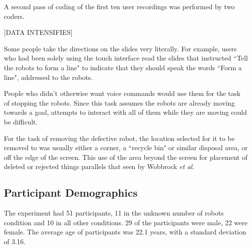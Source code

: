 \documentclass[]{article}
\begin{document}

A second pass of coding of the first ten user recordings was performed by two coders. 

[DATA INTENSIFIES]
 
Some people  take the directions on the slides very literally. 
For example, users who had been solely using the touch interface read the slides that instructed ``Tell the robots to form a line" to indicate that they should speak the words ``Form a line", addressed to the robots.

People  who didn't otherwise want voice commands would use them for the task of stopping the robots. 
Since this task assumes the robots are already moving towards a goal, attempts to interact with all of them while they are moving could be difficult. 

For the task of removing the defective robot, the location selected for it to be removed to was usually either a corner, a ``recycle bin" or similar disposal area, or off the edge of the screen. This use of the area beyond the screen for placement of deleted or rejected things parallels that seen by Wobbrock \textit{et al}.


\subsection{Participant Demographics}

The experiment had 51 participants, 11 in the unknown number of robots condition and 10 in all other conditions. 29 of the participants were male, 22 were female. The average age of participants was 22.1 years, with a standard deviation of 3.16. 
\end{document}
